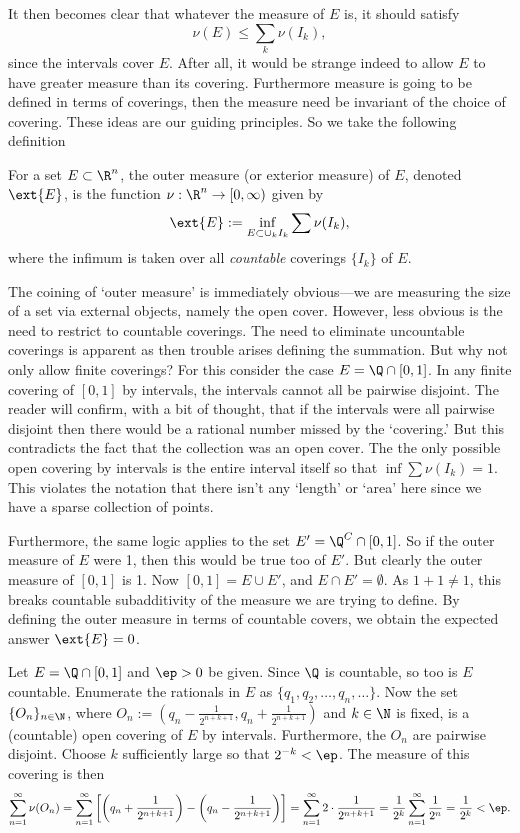 It then becomes clear that whatever the measure of $E$ is, it should satisfy
	\[
	\nu(E) \leq \sum_k \nu(I_k),
	\]
since the intervals cover $E$. After all, it would be strange indeed to allow $E$ to have greater measure than its covering. Furthermore measure is going to be defined in terms of coverings, then the measure need be invariant of the choice of covering. These ideas are our guiding principles. So we take the following definition 


\begin{dfn}
For a set $E \subset \R^n$, the outer measure (or exterior measure) of $E$, denoted $\ext{E}$, is the function $\nu: \R^n \to [0,\infty)$ given by
	\[
	\ext{E}:= \inf_{E \subset \cup_k I_k} \sum \nu(I_k),
	\]
where the infimum is taken over all \emph{countable} coverings $\{I_k\}$ of $E$. 
\end{dfn}


The coining of `outer measure' is immediately obvious---we are measuring the size of a set via external objects, namely the open cover. However, less obvious is the need to restrict to countable coverings. The need to eliminate uncountable coverings is apparent as then trouble arises defining the summation. But why not only allow finite coverings? For this consider the case $E= \Q \cap [0,1]$. In any finite covering of $[0,1]$ by intervals, the intervals cannot all be pairwise disjoint. The reader will confirm, with a bit of thought, that if the intervals were all pairwise disjoint then there would be a rational number missed by the `covering.' But this contradicts the fact that the collection was an open cover. The the only possible open covering by intervals is the entire interval itself so that $\inf \sum \nu(I_k)=1$. This violates the notation that there isn't any `length' or `area' here since we have a sparse collection of points. 


Furthermore, the same logic applies to the set $E'=\Q^C \cap [0,1]$. So if the outer measure of $E$ were 1, then this would be true too of $E'$. But clearly the outer measure of $[0,1]$ is 1. Now $[0,1]=E \cup E'$, and $E \cap E'=\emptyset$. As $1+1 \neq 1$, this breaks countable subadditivity of the measure we are trying to define. By defining the outer measure in terms of countable covers, we obtain the expected answer $\ext{E}=0$. 


\begin{ex}
Let $E=\Q \cap [0,1]$ and $\ep>0$ be given. Since $\Q$ is countable, so too is $E$ countable. Enumerate the rationals in $E$ as $\{q_1,q_2,\ldots,q_n,\ldots\}$. Now the set $\{O_n\}_{n \in \N}$, where $O_n:= (q_n- \frac{1}{2^{n+k+1}}, q_n+\frac{1}{2^{n+k+1}})$ and $k \in \N$ is fixed, is a (countable) open covering of $E$ by intervals. Furthermore, the $O_n$ are pairwise disjoint. Choose $k$ sufficiently large so that $2^{-k}<\ep$. The measure of this covering is then
	\[
	\sum_{n=1}^\infty \nu(O_n)= \sum_{n=1}^\infty \left[ \left(q_n+\frac{1}{2^{n+k+1}}\right) - \left(q_n- \frac{1}{2^{n+k+1}}\right) \right]= \sum_{n=1}^\infty 2 \cdot \dfrac{1}{2^{n+k+1}}= \dfrac{1}{2^k} \sum_{n=1}^\infty \dfrac{1}{2^n}= \dfrac{1}{2^k}<\ep.
	\] \xqed
\end{ex}


